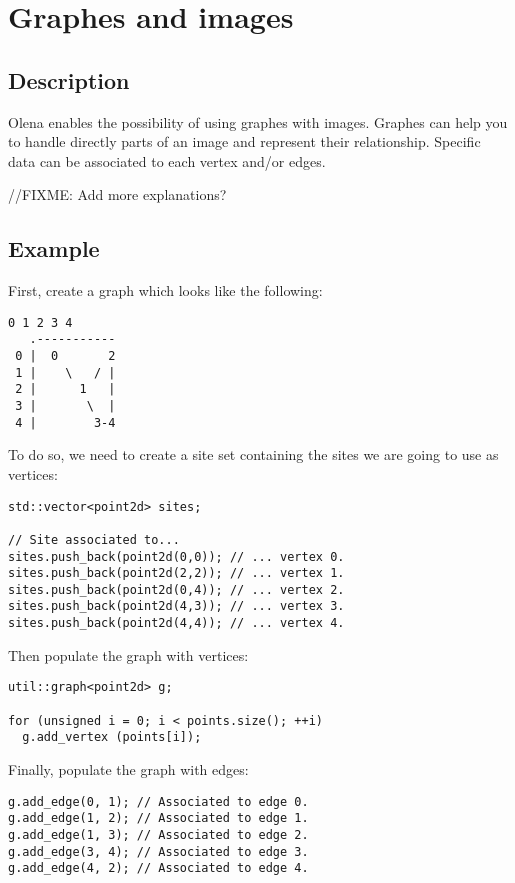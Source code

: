 \documentclass{report}
\begin{document}
\chapter{Graphes and images}
\section{Description}
Olena enables the possibility of using graphes with images.
Graphes can help you to handle directly parts of an image and represent their
relationship.
Specific data can be associated to each vertex and/or edges.

//FIXME: Add more explanations?

\section{Example}

First, create a graph which looks like the following:

\begin{lstlisting}[frame=single]
      0 1 2 3 4
   .-----------
 0 |  0       2
 1 |    \   / |
 2 |      1   |
 3 |       \  |
 4 |        3-4
\end{lstlisting}

To do so, we need to create a site set containing the sites we are going to use
as vertices:

\begin{lstlisting}
std::vector<point2d> sites;

// Site associated to...
sites.push_back(point2d(0,0)); // ... vertex 0.
sites.push_back(point2d(2,2)); // ... vertex 1.
sites.push_back(point2d(0,4)); // ... vertex 2.
sites.push_back(point2d(4,3)); // ... vertex 3.
sites.push_back(point2d(4,4)); // ... vertex 4.
\end{lstlisting}

Then populate the graph with vertices:
\begin{lstlisting}
util::graph<point2d> g;

for (unsigned i = 0; i < points.size(); ++i)
  g.add_vertex (points[i]);
\end{lstlisting}

Finally, populate the graph with edges:
\begin{lstlisting}
g.add_edge(0, 1); // Associated to edge 0.
g.add_edge(1, 2); // Associated to edge 1.
g.add_edge(1, 3); // Associated to edge 2.
g.add_edge(3, 4); // Associated to edge 3.
g.add_edge(4, 2); // Associated to edge 4.
\end{lstlisting}
\end{document}
